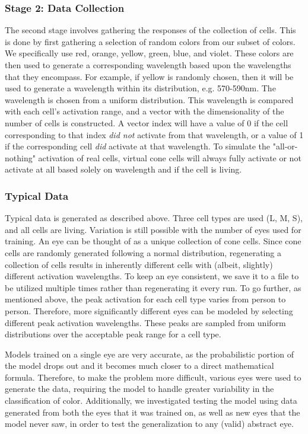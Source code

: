 \documentclass[titlepage]{article}
\begin{document}
\subsubsection{Stage 2: Data Collection}

The second stage involves gathering the responses of the collection of cells. This is done by first gathering a selection of random colors from our subset of colors. We specifically use red, orange, yellow, green, blue, and violet. These colors are then used to generate a corresponding wavelength based upon the wavelengths that they encompass. For example, if yellow is randomly chosen, then it will be used to generate a wavelength within its distribution, e.g. 570-590nm. The wavelength is chosen from a uniform distribution. This wavelength is compared with each cell's activation range, and a vector with the dimensionality of the number of cells is constructed. A vector index will have a value of 0 if the cell corresponding to that index \textit{did not} activate from that wavelength, or a value of 1 if the corresponding cell \textit{did} activate at that wavelength. To simulate the "all-or-nothing" activation of real cells, virtual cone cells will always fully activate or not activate at all based solely on wavelength and if the cell is living.

\subsubsection{Typical Data}

Typical data is generated as described above. Three cell types are used (L, M, S), and all cells are living. Variation is still possible with the number of eyes used for training. An eye can be thought of as a unique collection of cone cells. Since cone cells are randomly generated following a normal distribution, regenerating a collection of cells results in inherently different cells with (albeit, slightly) different activation wavelengths. To keep an eye consistent, we save it to a file to be utilized multiple times rather than regenerating it every run. To go further, as mentioned above, the peak activation for each cell type varies from person to person. Therefore, more significantly different eyes can be modeled by selecting different peak activation wavelengths. These peaks are sampled from uniform distributions over the acceptable peak range for a cell type. 

\bigskip

Models trained on a single eye are very accurate, as the probabilistic portion of the model drops out and it becomes much closer to a direct mathematical formula. Therefore, to make the problem more difficult, various eyes were used to generate the data, requiring the model to handle greater variability in the classification of color. Additionally, we investigated testing the model using data generated from both the eyes that it was trained on, as well as new eyes that the model never saw, in order to test the generalization to any (valid) abstract eye.
\end{document}
